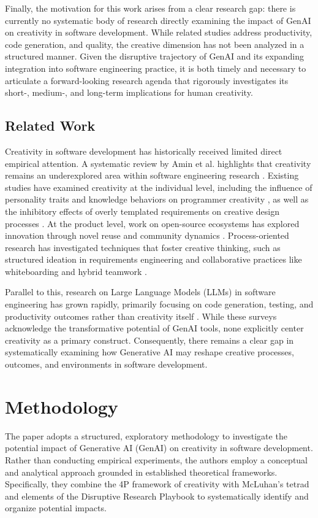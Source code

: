 Finally, the motivation for this work arises from a clear research gap: there is currently no systematic body of research directly examining the impact of GenAI on creativity in software development. While related studies address productivity, code generation, and quality, the creative dimension has not been analyzed in a structured manner. Given the disruptive trajectory of GenAI and its expanding integration into software engineering practice, it is both timely and necessary to articulate a forward-looking research agenda that rigorously investigates its short-, medium-, and long-term implications for human creativity.

\subsection{Related Work}
Creativity in software development has historically received limited direct empirical attention. A systematic review by Amin et al. highlights that creativity remains an underexplored area within software engineering research \cite{amin2018snapshot}. Existing studies have examined creativity at the individual level, including the influence of personality traits and knowledge behaviors on programmer creativity \cite{amin2020personality}, as well as the inhibitory effects of overly templated requirements on creative design processes \cite{mohanani2021templated}. At the product level, work on open-source ecosystems has explored innovation through novel reuse and community dynamics \cite{fang2024novelty}. Process-oriented research has investigated techniques that foster creative thinking, such as structured ideation in requirements engineering \cite{maiden2004provoking} and collaborative practices like whiteboarding and hybrid teamwork \cite{groeneveld2021exploring, jackson2022team}.

Parallel to this, research on Large Language Models (LLMs) in software engineering has grown rapidly, primarily focusing on code generation, testing, and productivity outcomes rather than creativity itself \cite{fan2023llmsurvey, hou2024llmreview}. While these surveys acknowledge the transformative potential of GenAI tools, none explicitly center creativity as a primary construct. Consequently, there remains a clear gap in systematically examining how Generative AI may reshape creative processes, outcomes, and environments in software development.

\section{Methodology}
The paper adopts a structured, exploratory methodology to investigate the potential impact of Generative AI (GenAI) on creativity in software development. Rather than conducting empirical experiments, the authors employ a conceptual and analytical approach grounded in established theoretical frameworks. Specifically, they combine the 4P framework of creativity \cite{rhodes1961analysis} with McLuhan’s tetrad \cite{mcluhan1977laws} and elements of the Disruptive Research Playbook \cite{storey2024disruptive} to systematically identify and organize potential impacts.

